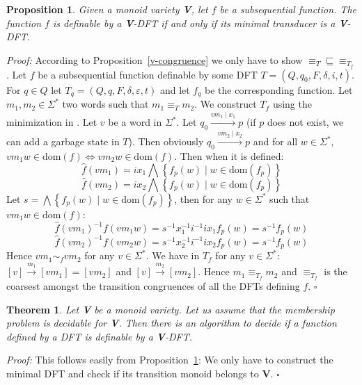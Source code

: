 \documentclass[12pt]{report}
\newtheorem{thm}{Theorem}[section]
\newtheorem{prp}{Proposition}[section]
\theoremstyle{definition}
\theoremstyle{remark}
\newenvironment{prf}
{\textit{Proof:}}
{\hfill $\square$\\}
\begin{document}
\begin{prp}
\label{prp4}
Given a monoid variety \textbf V, let $f$ be a subsequential function. The function $f$ is definable by a \textbf V-DFT if and only if its minimal transducer is a \textbf V-DFT.
\end{prp}
\begin{prf}
According to Proposition~\ref{v-congruence} we only have to show ${\equiv_T}\sqsubseteq{\equiv_{T_f}}$.
Let $f$ be a subsequential function definable by some DFT $T =(Q,q_0,F,\delta,i,t)$. For $q\in Q$ let $T_q=(Q,q,F,\delta,\varepsilon,t)$ and let $f_q$ be the corresponding function.
Let $m_1,m_2\in \Sigma^\ast$ two words such that $m_1\equiv _{T}m_2$.
We construct $T_f$ using the minimization in \cite{choffrut03}. Let $v$ be a word in $\Sigma^\ast$.
Let  $q_0\xrightarrow{vm_1\mid x_1}p$ (if $p$ does not exist, we can add a garbage state in $T$).
Then obviously $q_0\xrightarrow{vm_2\mid x_2}p$ and for all $w\in \Sigma^\ast$, $vm_1w\in \mathrm{dom}(f) \Leftrightarrow vm_2w\in \mathrm{dom}(f)$.
Then when it is defined:
$$\widehat f(vm_1)=ix_1\bigwedge \left\{ f_p(w)\mid  w\in \mathrm{dom} (f_p) \right\}$$
$$\widehat f(vm_2)=ix_2\bigwedge \left\{ f_p(w)\mid  w\in \mathrm{dom} (f_p) \right\}$$
Let $s=\bigwedge \left\{ f_p(w)\mid  w\in \mathrm{dom} (f_p) \right\}$,
then for any $w\in \Sigma^\ast$ such that $vm_1w\in \mathrm{dom}(f)$:
$$\widehat f(vm_1)^{-1}f(vm_1w)=s^{-1}x_1^{-1}i^{-1}ix_1f_p(w)=s^{-1}f_p(w)$$
$$\widehat f(vm_2)^{-1}f(vm_2w)=s^{-1}x_2^{-1}i^{-1}ix_2f_p(w)=s^{-1}f_p(w)$$
Hence $vm_1\sim_f vm_2$ for any $v\in \Sigma^\ast$.
We have in $T_f$ for any $v\in \Sigma^\ast$:
$[v]\xrightarrow{m_1}[vm_1]=[vm_2]$ and $[v]\xrightarrow{m_2}[vm_2]$.
Hence $m_1\equiv _{T_f}m_2$ and $\equiv _{T_f}$ is the coarsest amongst the transition congruences of all the DFTs defining $f$.
\end{prf}

\begin{thm}
Let \textbf V be a monoid variety. Let us assume that the membership problem is decidable for \textbf V.
Then there is an algorithm to decide if a function defined by a DFT is definable by a \textbf V-DFT.
\end{thm}

\begin{prf}
This follows easily from Proposition~\ref{prp4}:
We only have to construct the minimal DFT and check if its transition monoid belongs to \textbf V.
\end{prf}
\end{document}
